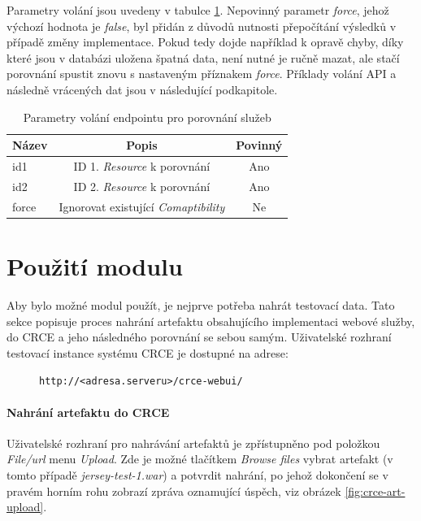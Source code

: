 \documentclass[czech,DP]{thesiskiv}
\begin{document}
Parametry volání jsou uvedeny v tabulce \ref{tab:rest-cmp-params}. Nepovinný parametr \textit{force}, jehož výchozí hodnota je \textit{false}, byl přidán z důvodů nutnosti přepočítání výsledků v případě změny implementace. Pokud tedy dojde například k opravě chyby, díky které jsou v databázi uložena špatná data, není nutné je ručně mazat, ale stačí porovnání spustit znovu s nastaveným příznakem \textit{force}. Příklady volání API a následně vrácených dat jsou v následující podkapitole.

\begin{table}[h]
	\centering
	\begin{tabular} {|l|c|c|}
		\hline
		Název & Popis & Povinný \\
		\hline
		\hline
		id1 & ID 1. \textit{Resource} k porovnání & Ano \\
		\hline
		id2 & ID 2. \textit{Resource} k porovnání & Ano \\
		\hline
		force & Ignorovat existující \textit{Comaptibility} & Ne \\
		\hline		
	\end{tabular}
	\caption{Parametry volání endpointu pro porovnání služeb}
	\label{tab:rest-cmp-params}
\end{table}

\section{Použití modulu}
\label{sec:module-how-to}

Aby bylo možné modul použít, je nejprve potřeba nahrát testovací data. Tato sekce popisuje proces nahrání artefaktu obsahujícího implementaci webové služby, do CRCE a jeho následného porovnání se sebou samým. Uživatelské rozhraní testovací instance systému CRCE je dostupné na adrese:

\begin{figure}[h]
	\centering
	\verb|http://<adresa.serveru>/crce-webui/|
\end{figure}

\paragraph{Nahrání artefaktu do CRCE}

Uživatelské rozhraní pro nahrávání artefaktů je zpřístupněno pod položkou  \textit{File/url} menu \textit{Upload}. Zde je možné tlačítkem \textit{Browse files} vybrat artefakt (v tomto případě \textit{jersey-test-1.war})  a potvrdit nahrání, po jehož dokončení se v pravém horním rohu zobrazí zpráva oznamující úspěch, viz obrázek \ref{fig:crce-art-upload}.
\end{document}
